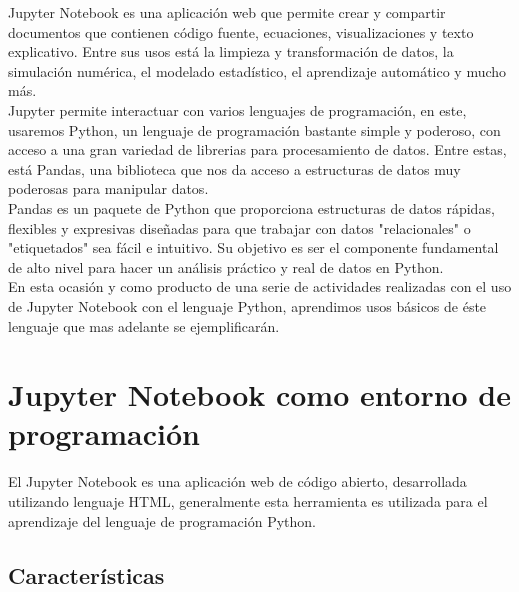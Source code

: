 \documentclass[12pt]{article}
\begin{document}
Jupyter Notebook es una aplicación web que permite crear y compartir documentos que contienen código fuente, ecuaciones, visualizaciones y texto explicativo. Entre sus usos está la limpieza y transformación de datos, la simulación numérica, el modelado estadístico, el aprendizaje automático y mucho más. \\

Jupyter permite interactuar con varios lenguajes de programación, en este, usaremos Python, un lenguaje de programación bastante simple y poderoso, con acceso a una gran variedad de librerias para procesamiento de datos. Entre estas, está Pandas, una biblioteca que nos da acceso a estructuras de datos muy poderosas para manipular datos.\\

Pandas es un paquete de Python que proporciona estructuras de datos rápidas, flexibles y expresivas diseñadas para que trabajar con datos "relacionales" o "etiquetados" sea fácil e intuitivo. Su objetivo es ser el componente fundamental de alto nivel para hacer un análisis práctico y real de datos en Python.\\

En esta ocasión y como producto de una serie de actividades realizadas con el uso de Jupyter Notebook con el lenguaje Python, aprendimos usos básicos de éste lenguaje que mas adelante se ejemplificarán.

\section{Jupyter Notebook como entorno de programación}

El Jupyter Notebook es una aplicación web de código abierto, desarrollada utilizando lenguaje HTML, generalmente esta herramienta es utilizada para el aprendizaje del lenguaje de programación Python.
\subsection{Características}
\end{document}
